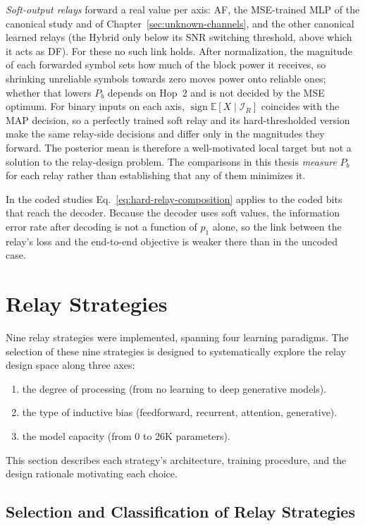 \emph{Soft-output relays} forward a real value per axis: AF, the MSE-trained MLP of the canonical study and of Chapter~\ref{sec:unknown-channels}, and the other canonical learned relays (the Hybrid only below its SNR switching threshold, above which it acts as DF). For these no such link holds. After normalization, the magnitude of each forwarded symbol sets how much of the block power it receives, so shrinking unreliable symbols towards zero moves power onto reliable ones; whether that lowers $P_b$ depends on Hop~2 and is not decided by the MSE optimum. For binary inputs on each axis, $\operatorname{sign}\mathbb{E}[X \mid \mathcal{I}_R]$ coincides with the MAP decision, so a perfectly trained soft relay and its hard-thresholded version make the same relay-side decisions and differ only in the magnitudes they forward. The posterior mean is therefore a well-motivated local target but not a solution to the relay-design problem. The comparisons in this thesis \emph{measure} $P_b$ for each relay rather than establishing that any of them minimizes it.

In the coded studies Eq.~\eqref{eq:hard-relay-composition} applies to the coded bits that reach the decoder. Because the decoder uses soft values, the information error rate after decoding is not a function of $p_1$ alone, so the link between the relay's loss and the end-to-end objective is weaker there than in the uncoded case.

\section{Relay Strategies}\label{sec:relay-strategies}

Nine relay strategies were implemented, spanning four learning paradigms. The selection of these nine strategies is designed to systematically explore the relay design space along three axes:
\begin{enumerate}
    \item  the degree of processing (from no learning to deep generative models).
    \item the type of inductive bias (feedforward, recurrent, attention, generative).
    \item the model capacity (from 0 to 26K parameters).
\end{enumerate}
This section describes each strategy's architecture, training procedure, and the design rationale motivating each choice.

\subsection{Selection and Classification of Relay Strategies}


